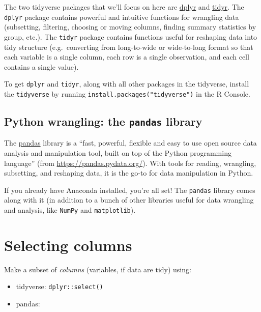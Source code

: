 \documentclass[
]{book}
\providecommand{\tightlist}{%
  \setlength{\itemsep}{0pt}\setlength{\parskip}{0pt}}
\begin{document}
The two tidyverse packages that we'll focus on here are \href{https://dplyr.tidyverse.org/}{dplyr} and \href{https://tidyr.tidyverse.org/}{tidyr}. The \texttt{dplyr} package contains powerful and intuitive functions for wrangling data (subsetting, filtering, choosing or moving columns, finding summary statistics by group, etc.). The \texttt{tidyr} package contains functions useful for reshaping data into tidy structure (e.g.~converting from long-to-wide or wide-to-long format so that each variable is a single column, each row is a single observation, and each cell contains a single value).

To get \texttt{dplyr} and \texttt{tidyr}, along with all other packages in the tidyverse, install the \texttt{tidyverse} by running \texttt{install.packages("tidyverse")} in the R Console.

\hypertarget{python-wrangling-the-pandas-library}{%
\subsection{\texorpdfstring{Python wrangling: the \texttt{pandas} library}{Python wrangling: the pandas library}}\label{python-wrangling-the-pandas-library}}

The \href{https://pandas.pydata.org/}{pandas} library is a ``fast, powerful, flexible and easy to use open source data analysis and manipulation tool,
built on top of the Python programming language'' (from \url{https://pandas.pydata.org/}). With tools for reading, wrangling, subsetting, and reshaping data, it is the go-to for data manipulation in Python.

If you already have Anaconda installed, you're all set! The \texttt{pandas} library comes along with it (in addition to a bunch of other libraries useful for data wrangling and analysis, like \texttt{NumPy} and \texttt{matplotlib}).

\hypertarget{selecting-columns}{%
\section{Selecting columns}\label{selecting-columns}}

Make a subset of \emph{columns} (variables, if data are tidy) using:

\begin{itemize}
\tightlist
\item
  tidyverse: \texttt{dplyr::select()}
\item
  pandas:
\end{itemize}
\end{document}
